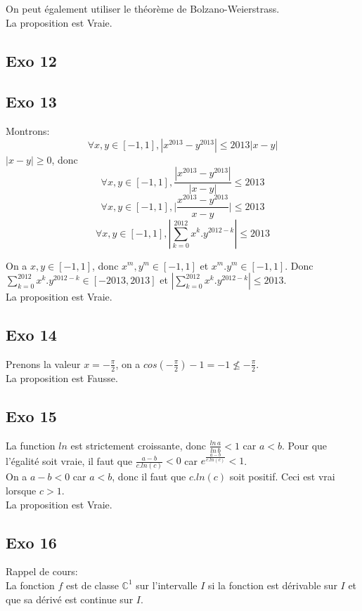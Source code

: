 \documentclass[]{book}
\theoremstyle{definition}
\newcommand{\bb}[1]{\mathbb{#1}}
\newcommand{\C}{\bb{C}}
\begin{document}
On peut \'egalement utiliser le th\'eor\`eme de Bolzano-Weierstrass.\\

La proposition est Vraie.

\subsection*{Exo 12}

\subsection*{Exo 13}
Montrons:
$$\forall x,y \in [-1,1],|x^{2013} - y^{2013}| \le 2013|x-y|$$
$|x-y| \ge 0$, donc
$$\forall x,y \in [-1,1],\frac{|x^{2013} - y^{2013}|}{|x-y|} \le 2013$$
$$\forall x,y \in [-1,1],\Big| \frac{x^{2013} - y^{2013}}{x-y} \Big| \le 2013$$
$$\forall x,y \in [-1,1], |\sum_{k=0}^{2012}x^k.y^{2012-k}| \le 2013$$

On a $x,y \in [-1,1]$, donc $x^m,y^m \in [-1,1]$ et $x^m.y^m \in [-1,1]$. Donc $\sum_{k=0}^{2012}x^k.y^{2012-k} \in [-2013,2013]$ et $|\sum_{k=0}^{2012}x^k.y^{2012-k}| \le 2013$.
\\

La proposition est Vraie.


\subsection*{Exo 14}
Prenons la valeur $x = -\frac{\pi}{2}$, on a $cos(-\frac{\pi}{2})-1 = -1 \nleq -\frac{\pi}{2}$.\\


La proposition est Fausse.


\subsection*{Exo 15}
La function $ln$ est strictement croissante, donc $\frac{ln\,a}{ln\,b} < 1$ car $a<b$. Pour que l'\'egalit\'e soit vraie, il faut que $\frac{a-b}{c.ln(c)} < 0$ car $e^{\frac{a-b}{c.ln(c)}} < 1$.\\
On a $a-b < 0$ car $a<b$, donc il faut que $c.ln(c)$ soit positif. Ceci est vrai lorsque $c > 1$.\\


La proposition est Vraie.


\subsection*{Exo 16}
Rappel de cours:\\
La fonction $f$ est de classe $\C^1$ sur l'intervalle $I$ si la fonction est d\'erivable sur $I$ et que sa d\'eriv\'e est continue sur $I$.
\end{document}
